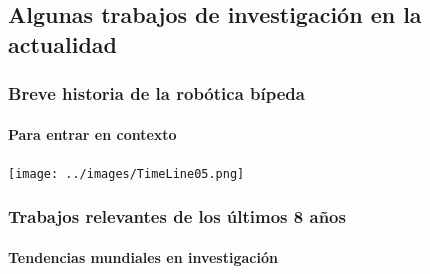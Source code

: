 {  \subsection[Investigaci\'on actual]{Algunas trabajos de investigaci\'on en la actualidad }
  \label{sec:algtra}
  \begin{frame}[label=timeline]
    \frametitle{Breve historia de la rob\'otica b\'ipeda}
    \framesubtitle{Para entrar en contexto}
    \texttt{[image: ../images/TimeLine05.png]}
  \end{frame}
  \begin{frame}[label=tendencias]
    \frametitle{Trabajos relevantes de los \'ultimos 8 a\~nos}
    \framesubtitle{Tendencias mundiales en investigaci\'on}
    \begin{columns}[T]
      \begin{column}{2.0cm}
      \end{column}
      \begin{column}{5.0cm}
\end{column}
\end{columns}
\end{frame}}
